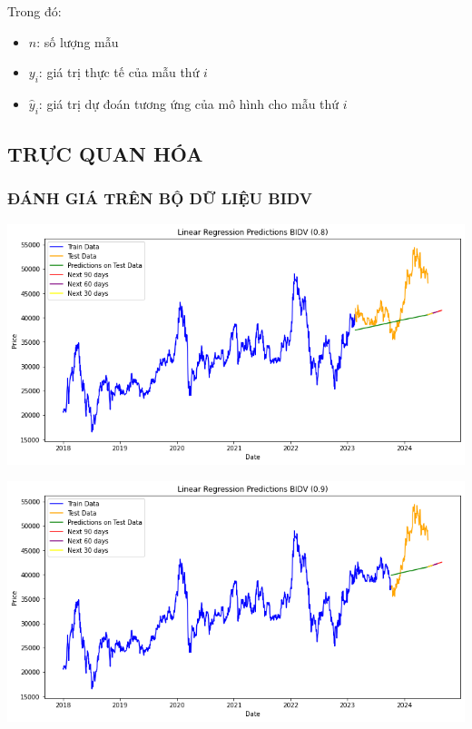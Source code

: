 \documentclass[conference]{IEEEtran}
\begin{document}
Trong đó:
\begin{itemize}
    \item \(n\): số lượng mẫu
    \item \(y_i\): giá trị thực tế của mẫu thứ \(i\)
    \item \(\hat{y}_i\): giá trị dự đoán tương ứng của mô hình cho mẫu thứ \(i\)
\end{itemize}



\subsection{TRỰC QUAN HÓA}

\subsubsection{ĐÁNH GIÁ TRÊN BỘ DỮ LIỆU BIDV}

\begin{minipage}{0.21\textwidth}
    \centering
    \includegraphics[width=\linewidth]{images/LR/LR_BIDV_82.png}
    \label{fig:image1}
\end{minipage}
\hfill
\begin{minipage}{0.21\textwidth}
    \centering
    \includegraphics[width=\linewidth]{images/LR/LR_BIDV_91.png}
    \label{fig:image2}
\end{minipage}
\end{document}
